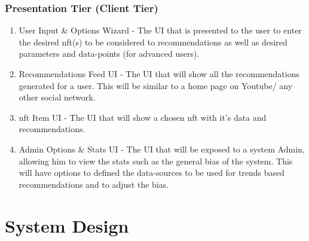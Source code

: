 \subsubsection{Presentation Tier (Client Tier)}
\begin{enumerate}
    \item User Input \& Options Wizard - The UI that is presented to the user to enter the desired \gls{nft}(s) to be considered to recommendations as well as desired parameters and data-points (for advanced users).
    \item Recommendations Feed UI - The UI that will show all the recommendations generated for a user. This will be similar to a home page on Youtube/ any other social network.
    \item \gls{nft} Item UI - The UI that will show a chosen \gls{nft} with it's data and recommendations.
    \item Admin Options \& Stats UI - The UI that will be exposed to a system Admin, allowing him to view the stats such as the general bias of the system. This will have options to defined the data-sources to be used for trends based recommendations and to adjust the bias.
\end{enumerate}





\section{System Design}
